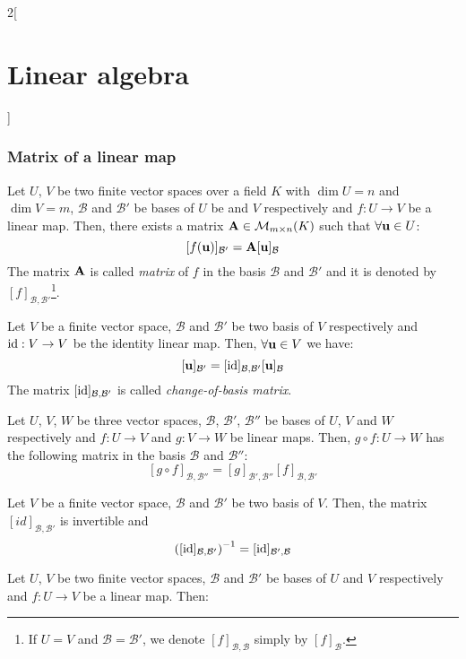 \documentclass[../../../main_math.tex]{subfiles}
\begin{document}
\begin{multicols}{2}[\section{Linear algebra}]
  \subsubsection{Matrix of a linear map}
  \begin{proposition}
    Let $U$, $V$ be two finite vector spaces over a field $K$ with $\dim U=n$ and $\dim V=m$, $\mathcal{B}$ and $\mathcal{B}'$ be bases of $U$ be and $V$ respectively and $f:U\rightarrow V$ be a linear map. Then, there exists a matrix $\boldsymbol{\mathrm{A}}\in\mathcal{M}_{m\times n}(K)$ such that $\forall\boldsymbol{\mathrm{u}}\in U$: $$[f(\boldsymbol{\mathrm{u}})]_{\mathcal{B}'}=\boldsymbol{\mathrm{A}}[\boldsymbol{\mathrm{u}}]_\mathcal{B}$$
    The matrix $\boldsymbol{\mathrm{A}}$ is called \emph{matrix} of $f$ in the basis $\mathcal{B}$ and $\mathcal{B}'$ and it is denoted by $[f]_{\mathcal{B},\mathcal{B}'}$\footnote{If $U=V$ and $\mathcal{B}=\mathcal{B}'$, we denote $[f]_{\mathcal{B},\mathcal{B}}$ simply by $[f]_{\mathcal{B}}$.}.
  \end{proposition}
  \begin{corollary}
    Let $V$ be a finite vector space, $\mathcal{B}$ and $\mathcal{B}'$ be two basis of $V$ respectively and $\mathrm{id}:V\rightarrow V$ be the identity linear map. Then, $\forall\boldsymbol{\mathrm{u}}\in V$ we have: $$[\boldsymbol{\mathrm{u}}]_{\mathcal{B}'}=[\mathrm{id}]_{\mathcal{B},\mathcal{B}'}[\boldsymbol{\mathrm{u}}]_\mathcal{B}$$ The matrix $[\mathrm{id}]_{\mathcal{B},\mathcal{B}'}$ is called \emph{change-of-basis matrix}.
  \end{corollary}
  \begin{proposition}
    Let $U$, $V$, $W$ be three vector spaces, $\mathcal{B}$, $\mathcal{B}'$, $\mathcal{B}''$ be bases of $U$, $V$ and $W$ respectively and $f:U\rightarrow V$ and $g:V\rightarrow W$ be linear maps. Then, $g\circ f:U\rightarrow W$ has the following matrix in the basis $\mathcal{B}$ and $\mathcal{B}''$: $$[g\circ f]_{\mathcal{B},\mathcal{B}''}=[g]_{\mathcal{B}',\mathcal{B}''}[f]_{\mathcal{B},\mathcal{B}'}$$
  \end{proposition}
  \begin{corollary}
    Let $V$ be a finite vector space, $\mathcal{B}$ and $\mathcal{B}'$ be two basis of $V$. Then, the matrix $[id]_{\mathcal{B},\mathcal{B}'}$ is invertible and $${\left([\mathrm{id}]_{\mathcal{B},\mathcal{B}'}\right)}^{-1}=[\mathrm{id}]_{\mathcal{B}',\mathcal{B}}$$
  \end{corollary}
  \begin{corollary}
    Let $U$, $V$ be two finite vector spaces, $\mathcal{B}$ and $\mathcal{B}'$ be bases of $U$ and $V$ respectively and $f:U\rightarrow V$ be a linear map. Then:
    \begin{enumerate}

\end{enumerate}
\end{corollary}
\end{multicols}
\end{document}
